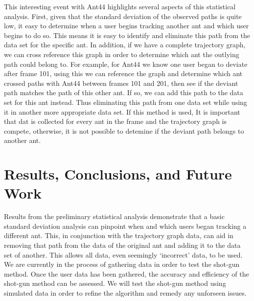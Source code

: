\documentclass[12pt]{article}
\begin{document}
\indent This interesting event with Ant44 highlights several aspects of this statistical analysis. First, given that the standard deviation of the observed paths is quite low, it easy to determine when a user begins tracking another ant and which user begins to do so. This means it is easy to identify and eliminate this path from the data set for the specific ant. In addition, if we have a complete trajectory graph, we can cross reference this graph in order to determine which ant the outlying path could belong to. For example, for Ant44 we know one user began to deviate after frame 101, using this we can reference the graph and determine which ant crossed paths with Ant44 between frames 101 and 201, then see if the deviant path matches the path of this other ant. If so, we can add this path to the data set for this ant instead. Thus eliminating this path from one data set while using it in another more appropriate data set. If this method is used, It is important that dat is collected for every ant in the frame and the trajectory graph is compete, otherwise, it is not possible to detemine if the deviant path belongs to another ant. \\
\section{Results, Conclusions, and Future Work}
Results from the preliminary statistical analysis demonstrate that a basic standard deviation analysis can pinpoint when and which users began tracking a different ant. This, in conjunction with the trajectory graph data, can aid in removing that path from the data of the original ant and adding it to the data set of another. This allows all data, even seemingly `incorrect' data, to be used. \\
\indent We are currently in the process of gathering data in order to test the shot-gun method. Once the user data has been gathered, the accuracy and efficiency of the shot-gun method can be assessed. We will test the shot-gun method using simulated data in order to refine the algorithm and remedy any unforseen issues.


\newpage


\end{document}
